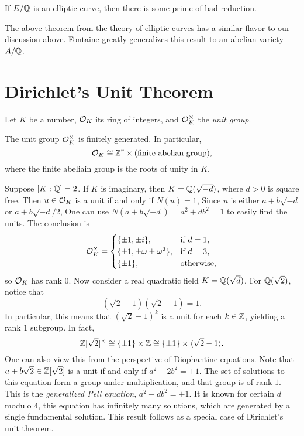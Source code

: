 \begin{theorem}[Tate?]
  If $E / \mathbb{Q}$ is an elliptic curve, then there is some
  prime of bad reduction.
\end{theorem}

\begin{remark}
  The above theorem from the theory of elliptic curves
  has a similar flavor to our
  discussion above. Fontaine greatly generalizes this result to
  an abelian variety $A / \mathbb{Q}$.
\end{remark}

\section{Dirichlet's Unit Theorem}

\begin{remark}
  Let $K$ be a number, $\mathcal{O}_K$ its ring of integers, and
  $\mathcal{O}_K^\times$ the \emph{unit group}.
\end{remark}

\begin{theorem}
  The unit group $\mathcal{O}_K^\times$ is finitely generated. In
  particular,
  \[
    \mathcal{O}_K \cong \mathbb{Z}^r \times (\text{finite abelian group}),
  \]
  where the finite abeliain group is the roots of unity in $K$.
\end{theorem}

\begin{example}
  Suppose $[K : \mathbb{Q}] = 2$. If $K$ is imaginary, then
  $K = \mathbb{Q}(\sqrt{-d})$, where $d > 0$ is square free. Then
  $u \in \mathcal{O}_K$ is a unit if and only if $N(u) = 1$,
  Since $u$ is either $a + b \sqrt{-d}$ or $a + b \sqrt{-d} / 2$,
  One can use $N(a + b\sqrt{-d}) = a^2 + db^2 = 1$ to
  easily find the units. The conclusion is
  \[
    \mathcal{O}_K^\times =
    \begin{cases}
      \{\pm 1, \pm i\}, & \text{if } d = 1, \\
      \{\pm 1, \pm \omega \pm \omega^2\}, & \text{if } d = 3, \\
      \{\pm 1\}, & \text{otherwise},
    \end{cases}
  \]
  so $\mathcal{O}_K$ has rank $0$. Now consider a real
  quadratic field $K = \mathbb{Q}(\sqrt{d})$.
  For $\mathbb{Q}(\sqrt{2})$, notice that
  \[
    (\sqrt{2} - 1) (\sqrt{2} + 1) = 1.
  \]
  In particular, this means that $(\sqrt{2} - 1)^k$ is a
  unit for each $k \in \mathbb{Z}$, yielding a rank $1$ subgroup.
  In fact,
  \[
    \mathbb{Z}[\sqrt{2}]^\times
    \cong \{\pm 1\} \times \mathbb{Z}
    \cong \{\pm 1\} \times \langle \sqrt{2} - 1 \rangle.
  \]
  One can also view this from the perspective of Diophantine
  equations. Note that $a + b\sqrt{2} \in \mathbb{Z}[\sqrt{2}]$
  is a unit if and only if $a^2 - 2b^2 = \pm 1$. The
  set of solutions to this equation form a group under
  multiplication, and that group is of rank $1$.
  This is the \emph{generalized Pell equation},
  $a^2 - db^2 = \pm 1$. It is known for certain $d$ modulo
  $4$, this equation has
  infinitely many solutions, which are generated by a single
  fundamental solution. This result follows as a special case
  of Dirichlet's unit theorem.
\end{example}

